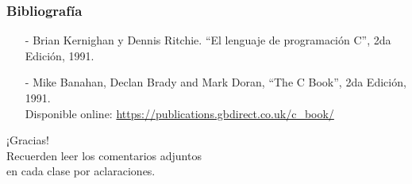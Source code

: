 \documentclass[aspectratio=169]{beamer}
\begin{document}
\begin{frame}[fragile]
    \frametitle{Bibliografía}
    \begin{itemize}
     \setlength\itemsep{0.5cm}
      \item[-] \small Brian Kernighan y Dennis Ritchie. “El lenguaje de programación C”, 2da Edición, 1991.\\
      \item[-] \small Mike Banahan, Declan Brady and Mark Doran, “The C Book”, 2da Edición, 1991.\\
      Disponible online: \url{https://publications.gbdirect.co.uk/c_book/}
    \end{itemize}
\end{frame}

\begin{frame}[plain]
    \begin{center}
    \vspace{2cm}
    \huge ¡Gracias!\\
    \vspace{2cm}
    \normalsize Recuerden leer los comentarios adjuntos\\ en cada clase por aclaraciones.
    \end{center}
\end{frame}
\end{document}
